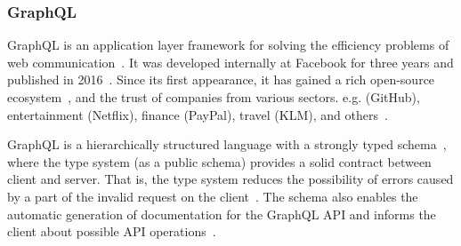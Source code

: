 \begin{frame}\frametitle{GraphQL}





GraphQL is an application layer framework for solving the efficiency problems of web communication~\cite{gql-iot}. It was developed internally at  Facebook for three years and published in 2016~\cite{initial-analysis-of-gql}. Since its first appearance, it has gained a rich open-source ecosystem~\cite{gql-healthcare}, and the trust of companies from various sectors. e.g. (GitHub), entertainment (Netflix), finance (PayPal), travel (KLM), and others~\cite{morph-gql-1}.

GraphQL is a hierarchically structured language with a strongly typed schema~\cite{gql-healthcare}, where the type system (as a public schema) provides a solid contract between client and server. That is, the type system reduces the possibility of errors caused by a part of the invalid request on the client~\cite{real-time-sys-arc-based-on-gql}. The schema also enables the automatic generation of documentation for the GraphQL API and informs the client about possible API operations~\cite{gql-jbpm}.

\end{frame}

